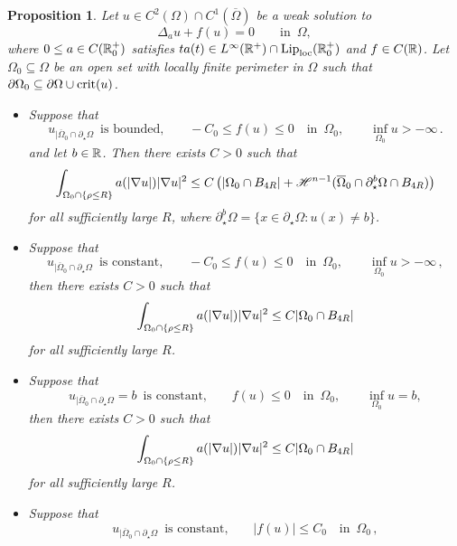\documentclass[10 pt,a4paper]{article}
\newtheorem{proposition}[definition]{Proposition}
\theoremstyle{definition}
\begin{document}
\begin{proposition} \label{prop_1_calib}
	Let $u \in C^2(\Omega) \cap C^1(\overline\Omega)$ be a weak solution to
	\[
		\Delta_a u + f(u) = 0 \qquad \text{in } \, \Omega,
	\]
	where $0 \le a \in C(\mathbb R^+_0)$ satisfies $ta(t) \in L^\infty(\mathbb R^+) \cap \mathrm{Lip}_{\mathrm{loc}}(\mathbb R^+_0)$ and $f \in C(\mathbb R)$. Let $\Omega_0\subseteq\Omega$ be an open set with locally finite perimeter in $\Omega$ such that $\partial\Omega_0 \subseteq \partial\Omega \cup {\rm crit}(u)$.
	\begin{itemize}
		\item [$(i)$] Suppose that
		\[
			u_{|\overline{\Omega}_0 \cap \partial_\star\Omega} \, \text{ is bounded,} \qquad -C_0 \leq f(u) \leq 0 \quad \text{in } \, \Omega_0, \qquad \inf_{\Omega_0} u > -\infty \, .
		\]
		and let $b\in\mathbb R$. Then there exists $C>0$ such that
		\begin{equation}
			\int_{\Omega_0\cap\{\rho\leq R\}} a(|\nabla u|) |\nabla u|^2 \leq C \left(|\Omega_0\cap B_{4R}| + \mathscr{H}^{n-1}(\overline{\Omega}_0 \cap \partial^b_\star\Omega \cap B_{4R}) \right)
		\end{equation}
		for all sufficiently large $R$, where $\partial_\star^b\Omega=\{ x \in \partial_\star \Omega : u(x) \neq b\}$. %
		\item[$(ii)$] Suppose that
		\[
		u_{|\overline{\Omega}_0 \cap \partial_\star\Omega} \, \text{ is constant,} \qquad -C_0 \leq f(u) \leq 0 \quad \text{in } \, \Omega_0, \qquad \inf_{\Omega_0} u > -\infty \, ,
		\]
		then there exists $C>0$ such that
		\begin{equation}
			\int_{\Omega_0\cap\{\rho\leq R\}} a(|\nabla u|) |\nabla u|^2 \leq C |\Omega_0\cap B_{4R}|
		\end{equation}
		for all sufficiently large $R$. %
		\item[$(iii)$] Suppose that 
		\[
		u_{|\overline{\Omega}_0 \cap \partial_\star\Omega} = b \, \text{ is constant,} \qquad f(u) \leq 0 \quad \text{in } \, \Omega_0, \qquad \inf_{\Omega_0} u = b ,
		\]
		then there exists $C>0$ such that
		\begin{equation}
			\int_{\Omega_0\cap\{\rho\leq R\}} a(|\nabla u|) |\nabla u|^2 \leq C |\Omega_0\cap B_{4R}|
		\end{equation}
		for all sufficiently large $R$.
		\item [$(iv)$] Suppose that
		\[
			u_{|\overline{\Omega}_0 \cap\partial_\star\Omega} \, \text{ is constant,} \qquad |f(u)| \leq C_0 \quad \text{in } \, \Omega_0 \, ,
\]
\end{itemize}
\end{proposition}
\end{document}
